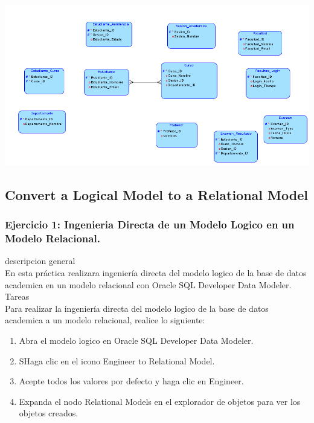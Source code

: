 \documentclass[12pt,letterpaper]{article}
\begin{document}
\begin{center}
    \includegraphics[width=16cm]{./IMAGENES/bd222222222222222222222.png} 
\end{center}




 \newpage
\subsection{Convert a Logical Model to a Relational Model}
 \newpage
\subsubsection{Ejercicio 1: Ingenieria Directa de un Modelo Logico en un Modelo Relacional.} 
descripcion general  \\
En esta práctica realizara ingeniería directa del modelo logico de la base de datos academica en un modelo relacional con Oracle SQL Developer Data Modeler. \\

Tareas\\
Para realizar la ingeniería directa del modelo logico de la base de datos academica a un modelo relacional, realice lo siguiente:
\begin{enumerate}[1.]
    \item  Abra el modelo logico en Oracle SQL Developer Data Modeler. 
     
    \item SHaga clic en el icono Engineer to Relational Model.
    
    \item Acepte todos los valores por defecto y haga clic en Engineer.
    
     \item Expanda el nodo Relational Models en el explorador de objetos para ver los objetos creados.
		\end{enumerate}
\end{document}
